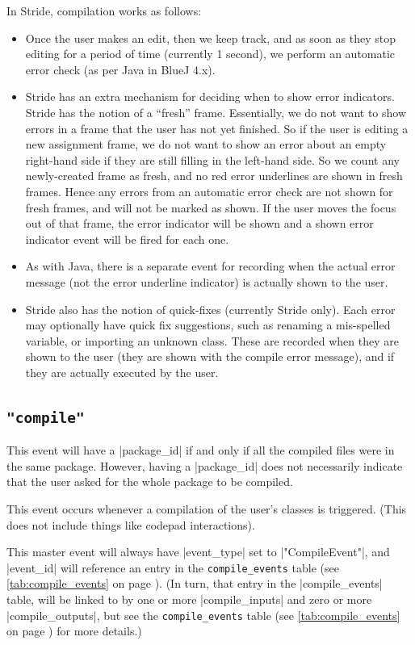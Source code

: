 \documentclass{report}
\newcommand{\myref}[1]{\autoref{#1} on page \pageref*{#1}}
\newcommand{\tabref}[1]{\lstinline|#1| table (see \myref{tab:#1})}
\begin{document}
In Stride, compilation works as follows:
\begin{itemize}
\item Once the user makes an edit, then we keep track, and as soon as they stop editing
for a period of time (currently 1 second), we perform an automatic error check (as per
Java in BlueJ 4.x).
\item Stride has an extra mechanism for deciding when to show error indicators.  Stride
has the notion of a ``fresh'' frame.  Essentially, we do not want to show errors in a frame
that the user has not yet finished.  So if the user is editing a new assignment frame, we do
not want to show an error about an empty right-hand side if they are still filling in the
 left-hand side.  So we count any newly-created frame as fresh, and no red error underlines
 are shown in fresh frames.  Hence any errors from an automatic error check are not shown for
 fresh frames, and will not be marked as shown.  If the user moves the focus out of that frame,
 the error indicator will be shown and a shown error indicator event will be fired for each one.
\item As with Java, there is a separate event for recording when the actual error message
(not the error underline indicator) is actually shown to the user.
\item Stride also has the notion of quick-fixes (currently Stride only).  Each error may optionally
have quick fix suggestions, such as renaming a mis-spelled variable, or importing an unknown class.
These are recorded when they are shown to the user (they are shown with the compile error message), and if they are actually executed by the user.
\end{itemize}

\subsection{\lstinline!"compile"!}

This event will have a |package_id| if and only if all the compiled files were
in the same package.  However, having a |package_id| does not necessarily
indicate that the user asked for the whole package to be compiled.

This event occurs whenever a compilation of the user's classes is triggered.
(This does not include things like codepad interactions).

This master event will always have |event_type| set to |"CompileEvent"|, and
|event_id| will reference an entry in the \tabref{compile_events}.  (In turn,
that entry in the |compile_events| table, will be linked to by one or more
|compile_inputs| and zero or more |compile_outputs|, but see the
\tabref{compile_events} for more details.)
\end{document}
